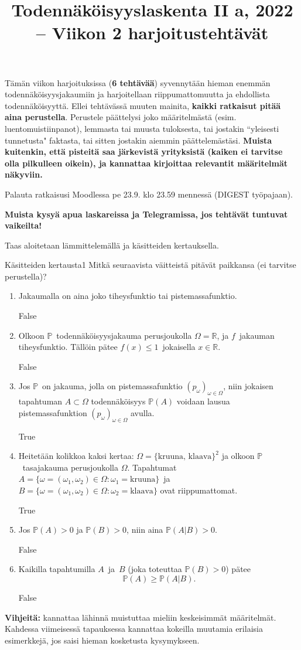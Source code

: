 \documentclass[11pt,a4paper]{amsart}
\title{Todennäköisyyslaskenta II a, 2022 -- Viikon 2 harjoitustehtävät}
\newcommand{\R}{\mathbb{R}}
\newcommand{\1}{\mathbf{1}}
\renewcommand{\P}{\mathbb P}
\begin{document}
\maketitle

Tämän viikon harjoituksissa ({\bf 6 tehtävää}) syvennytään hieman enemmän todennäköisyysjakaumiin ja harjoitellaan riippumattomuutta ja ehdollista todennäköisyyttä. Ellei tehtävässä muuten mainita,  {\bf kaikki ratkaisut pitää aina perustella}. Perustele päättelysi joko määritelmästä (esim. luentomuistiinpanot), lemmasta tai muusta tuloksesta, tai jostakin ``yleisesti tunnetusta" faktasta, tai sitten jostakin aiemmin päättelemästäsi. {\bf Muista kuitenkin, että pisteitä saa järkevistä yrityksistä (kaiken ei tarvitse olla pilkulleen oikein), ja kannattaa kirjoittaa relevantit määritelmät näkyviin.}

Palauta ratkaisusi Moodlessa pe 23.9. klo 23.59 mennessä (DIGEST työpajaan).

\medskip

 {\bf Muista kysyä apua laskareissa ja Telegramissa, jos tehtävät tuntuvat vaikeilta!}


\medskip 

Taas aloitetaan lämmittelemällä ja käsitteiden kertauksella. 
\begin{Exercises}{Käsitteiden kertausta}{1}
Mitkä seuraavista väitteistä pitävät paikkansa (ei tarvitse perustella)? 
\begin{enumerate}
\item  Jakaumalla on aina joko tiheysfunktio tai pistemassafunktio.

    False
\item Olkoon $\P$ todennäköisyysjakauma perusjoukolla $\Omega=\R$, ja $f$ jakauman tiheysfunktio. Tällöin pätee $f(x)\leq 1$ jokaisella $x\in \R$.

    False
\item Jos $\P$ on jakauma, jolla on pistemassafunktio $(p_\omega)_{\omega\in \Omega}$, niin jokaisen tapahtuman $A\subset \Omega$ todennäköisyys $\P(A)$ voidaan lausua pistemassafunktion $(p_\omega)_{\omega\in \Omega}$ avulla.

    True
\item Heitetään kolikkoa kaksi kertaa: $\Omega=\{\text{kruuna, klaava}\}^2$ ja olkoon $\P$ tasajakauma perusjoukolla $\Omega$. Tapahtumat $A=\{\omega=(\omega_1,\omega_2)\in \Omega: \omega_1=\text{kruuna}\}$ ja $B=\{\omega=(\omega_1,\omega_2)\in \Omega: \omega_2=\text{klaava}\}$ ovat riippumattomat.

    True
\item Jos $\P(A)>0$ ja $\P(B)>0$, niin aina $\P(A|B)>0$.

    False
\item Kaikilla tapahtumilla $A$ ja $B$ (joka toteuttaa $\P(B)>0$) pätee 
\[
\P(A)\geq \P(A|B).
\]

    False
\end{enumerate}
{\bf Vihjeitä:} kannattaa lähinnä muistuttaa mieliin keskeisimmät määritelmät. Kahdessa viimeisessä tapauksessa kannattaa kokeilla muutamia erilaisia esimerkkejä, jos saisi hieman kosketusta kysymykseen.
\end{Exercises}
\end{document}
